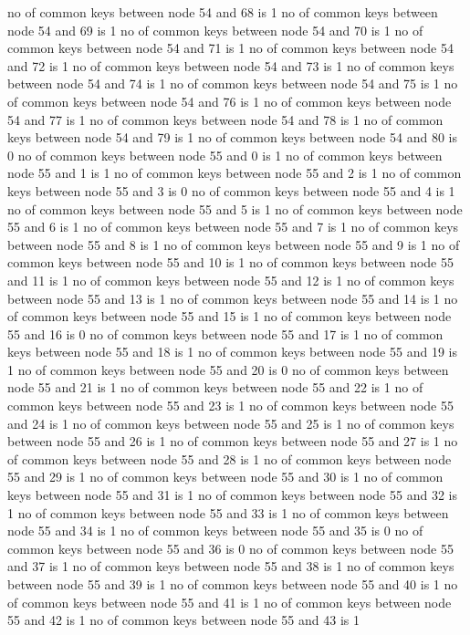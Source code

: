 no of common keys between node 54 and 68 is 1
no of common keys between node 54 and 69 is 1
no of common keys between node 54 and 70 is 1
no of common keys between node 54 and 71 is 1
no of common keys between node 54 and 72 is 1
no of common keys between node 54 and 73 is 1
no of common keys between node 54 and 74 is 1
no of common keys between node 54 and 75 is 1
no of common keys between node 54 and 76 is 1
no of common keys between node 54 and 77 is 1
no of common keys between node 54 and 78 is 1
no of common keys between node 54 and 79 is 1
no of common keys between node 54 and 80 is 0
no of common keys between node 55 and 0 is 1
no of common keys between node 55 and 1 is 1
no of common keys between node 55 and 2 is 1
no of common keys between node 55 and 3 is 0
no of common keys between node 55 and 4 is 1
no of common keys between node 55 and 5 is 1
no of common keys between node 55 and 6 is 1
no of common keys between node 55 and 7 is 1
no of common keys between node 55 and 8 is 1
no of common keys between node 55 and 9 is 1
no of common keys between node 55 and 10 is 1
no of common keys between node 55 and 11 is 1
no of common keys between node 55 and 12 is 1
no of common keys between node 55 and 13 is 1
no of common keys between node 55 and 14 is 1
no of common keys between node 55 and 15 is 1
no of common keys between node 55 and 16 is 0
no of common keys between node 55 and 17 is 1
no of common keys between node 55 and 18 is 1
no of common keys between node 55 and 19 is 1
no of common keys between node 55 and 20 is 0
no of common keys between node 55 and 21 is 1
no of common keys between node 55 and 22 is 1
no of common keys between node 55 and 23 is 1
no of common keys between node 55 and 24 is 1
no of common keys between node 55 and 25 is 1
no of common keys between node 55 and 26 is 1
no of common keys between node 55 and 27 is 1
no of common keys between node 55 and 28 is 1
no of common keys between node 55 and 29 is 1
no of common keys between node 55 and 30 is 1
no of common keys between node 55 and 31 is 1
no of common keys between node 55 and 32 is 1
no of common keys between node 55 and 33 is 1
no of common keys between node 55 and 34 is 1
no of common keys between node 55 and 35 is 0
no of common keys between node 55 and 36 is 0
no of common keys between node 55 and 37 is 1
no of common keys between node 55 and 38 is 1
no of common keys between node 55 and 39 is 1
no of common keys between node 55 and 40 is 1
no of common keys between node 55 and 41 is 1
no of common keys between node 55 and 42 is 1
no of common keys between node 55 and 43 is 1
